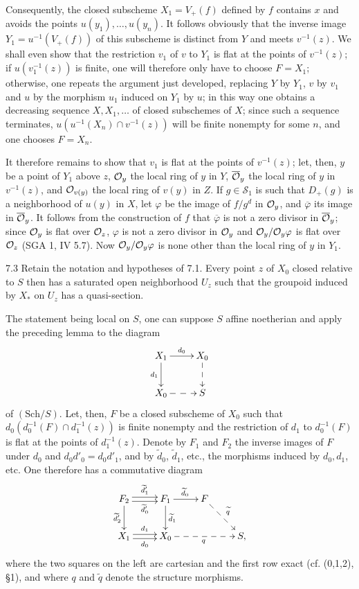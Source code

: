 Consequently, the closed subscheme $X_1=V_+(f)$ defined by $f$ contains $x$ and avoids the points $u(y_1),\ldots,u(y_n)$. It follows obviously that the inverse image $Y_1=u^{-1}(V_+(f))$ of this subscheme is distinct from $Y$ and meets $v^{-1}(z)$. We shall even show that the restriction $v_1$ of $v$ to $Y_1$ is flat at the points of $v^{-1}(z)$; if $u(v_1^{-1}(z))$ is finite, one will therefore only have to choose $F=X_1$; otherwise, one repeats the argument just developed, replacing $Y$ by $Y_1$, $v$ by $v_1$ and $u$ by the morphism $u_1$ induced on $Y_1$ by $u$; in this way one obtains a decreasing sequence $X,X_1,\ldots$ of closed subschemes of $X$; since such a sequence terminates, $u(u^{-1}(X_n)\cap v^{-1}(z))$ will be finite nonempty for some $n$, and one chooses $F=X_n$.

It therefore remains to show that $v_1$ is flat at the points of $v^{-1}(z)$; let, then, $y$ be a point of $Y_1$ above $z$, $\mathcal{O}_y$ the local ring of $y$ in $Y$, $\overline{\mathcal{O}}_y$ the local ring of $y$ in $v^{-1}(z)$, and $\mathcal{O}_{v(y)}$ the local ring of $v(y)$ in $Z$. If $g\in\mathcal S_1$ is such that $D_+(g)$ is a neighborhood of $u(y)$ in $X$, let $\varphi$ be the image of $f/g^d$ in $\mathcal{O}_y$, and $\overline\varphi$ its image in $\overline{\mathcal{O}}_y$. It follows from the construction of $f$ that $\overline\varphi$ is not a zero divisor in $\overline{\mathcal{O}}_y$; since $\mathcal{O}_y$ is flat over $\mathcal{O}_z$, $\varphi$ is not a zero divisor in $\mathcal{O}_y$ and $\mathcal{O}_y/\mathcal{O}_y\varphi$ is flat over $\mathcal{O}_z$ (SGA 1, IV 5.7). Now $\mathcal{O}_y/\mathcal{O}_y\varphi$ is none other than the local ring of $y$ in $Y_1$.
\begin{lemma}{7.3}\label{V.7.3}
Retain the notation and hypotheses of 7.1. Every point $z$ of $X_0$ closed relative to $S$ then has a saturated open neighborhood $U_z$ such that the groupoid induced by $X_*$ on $U_z$ has a quasi-section.
\end{lemma}
The statement being local on $S$, one can suppose $S$ affine noetherian and apply the preceding lemma to the diagram
\[
\xymatrix{X_1\ar[r]^{d_0}\ar[d]_{d_1}&X_0\ar@{-->}[d]\\X_0\ar@{-->}[r]&S}
\]
of $(\mathrm{Sch}/S)$. Let, then, $F$ be a closed subscheme of $X_0$ such that $d_0(d_0^{-1}(F)\cap d_1^{-1}(z))$ is finite nonempty and the restriction of $d_1$ to $d_0^{-1}(F)$ is flat at the points of $d_1^{-1}(z)$. Denote by $F_1$ and $F_2$ the inverse images of $F$ under $d_0$ and $d_0d'_0=d_0d'_1$, and by $\widetilde d_0$, $\widetilde d_1$, etc., the morphisms induced by $d_0,d_1$, etc. One therefore has a commutative diagram
\[
\xymatrix{F_2\ar@<.5ex>[r]^{\widetilde d'_1}\ar@<-.5ex>[r]_{\widetilde d'_0}\ar[d]_{\widetilde d'_2}&F_1\ar[r]^{\widetilde d_0}\ar[d]^{\widetilde d_1}&F\ar@{-->}[dr]^{\widetilde q}&\\X_1\ar@<.5ex>[r]^{d_1}\ar@<-.5ex>[r]_{d_0}&X_0\ar@{-->}[rr]_q&&S,}
\]
where the two squares on the left are cartesian and the first row exact (cf. (0,1,2), §1), and where $q$ and $\widetilde q$ denote the structure morphisms.

